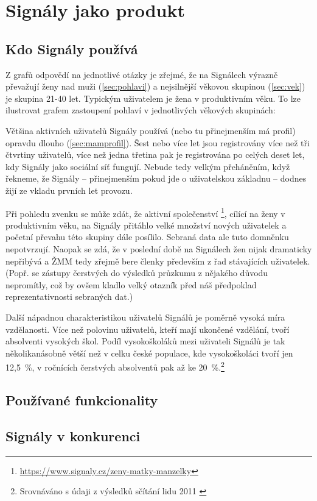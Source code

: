 \section{Signály jako produkt}

\subsection{Kdo Signály používá}

Z grafů odpovědí na jednotlivé otázky je zřejmé,
že na Signálech výrazně převažují ženy nad muži (\ref{sec:pohlavi})
a nejsilnější věkovou skupinou (\ref{sec:vek}) je skupina
21-40 let. Typickým uživatelem je žena v produktivním věku.
To lze ilustrovat grafem zastoupení pohlaví v jednotlivých
věkových skupinách:


Většina aktivních uživatelů Signály používá
(nebo tu přinejmenším má profil) opravdu dlouho (\ref{sec:mamprofil}).
Šest nebo více let jsou registrovány více než tři čtvrtiny uživatelů,
více než jedna třetina pak je registrována po celých deset let,
kdy Signály jako sociální síť fungují. Nebude tedy velkým
přeháněním, když řekneme, že Signály -- přinejmenším pokud
jde o uživatelskou základnu -- dodnes žijí ze vkladu prvních let
provozu.

Při pohledu zvenku se může zdát, že aktivní společenství
\footnote{
  \url{https://www.signaly.cz/zeny-matky-manzelky}},
cílící na ženy v produktivním věku, na Signály přitáhlo
velké množství nových uživatelek a početní převahu této skupiny
dále posílilo. Sebraná data ale tuto domněnku nepotvrzují.
Naopak se zdá, že v poslední době na Signálech žen nijak
dramaticky nepřibývá a ŽMM tedy zřejmě bere členky především
z řad stávajících uživatelek.
(Popř. se zástupy čerstvých  do výsledků
průzkumu z nějakého důvodu nepromítly, což by ovšem kladlo
velký otazník před náš předpoklad reprezentativnosti sebraných dat.)


Další nápadnou charakteristikou uživatelů Signálů je poměrně
vysoká míra vzdělanosti. Více než polovinu uživatelů,
kteří mají ukončené vzdělání, tvoří absolventi vysokých
škol.
Podíl vysokoškoláků mezi uživateli Signálů je tak několikanásobně
větší než v celku české populace, kde vysokoškoláci tvoří jen 12,5~\%,
v ročnících čerstvých absolventů pak až ke 20~\%.\footnote{
  Srovnáváno s údaji z výsledků sčítání lidu 2011
  \cite{sl2011vzdelani}
}


\subsection{Používané funkcionality}

\subsection{}

\subsection{Signály v konkurenci}
